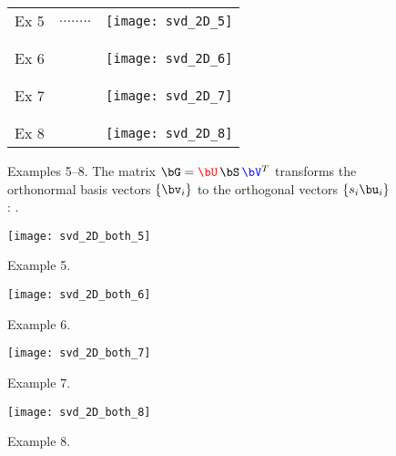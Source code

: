 \documentclass[11pt,titlepage,fleqn]{article}
\begin{document}
\clearpage\pagebreak
\pagestyle{empty}
\begin{figure}
\centering
\begin{tabular}{rcc}
Ex 5 & $........$ & \texttt{[image: svd\_2D\_5]} \\ \\ \\
Ex 6 & &\texttt{[image: svd\_2D\_6]} \\ \\ \\
Ex 7 & &\texttt{[image: svd\_2D\_7]} \\ \\ \\
Ex 8 & &\texttt{[image: svd\_2D\_8]} 
\end{tabular}
\caption[]
{{
Examples 5--8.
The matrix $\bG = \Ucolor\,\bS\,\Vcolor^T$ transforms the orthonormal basis vectors \textcolor{blue}{$\{\bv_i\}$} to the orthogonal vectors \textcolor{red}{$\{s_i\bu_i\}$}: \makebox{$\bG\Vcolor = \Ucolor\,\bS$}.
\label{fig:2D}
}}
\end{figure}

\clearpage\pagebreak
\begin{figure}
\hspace{-1cm}
\texttt{[image: svd\_2D\_both\_5]}
\caption[]
{{
Example 5.
\label{fig:ex5}
}}
\end{figure}

\clearpage\pagebreak
\begin{figure}
\hspace{-1cm}
\texttt{[image: svd\_2D\_both\_6]}
\caption[]
{{
Example 6.
\label{fig:ex6}
}}
\end{figure}

\clearpage\pagebreak
\begin{figure}
\hspace{-1cm}
\texttt{[image: svd\_2D\_both\_7]}
\caption[]
{{
Example 7.
\label{fig:ex7}
}}
\end{figure}

\clearpage\pagebreak
\begin{figure}
\hspace{-1cm}
\texttt{[image: svd\_2D\_both\_8]}
\caption[]
{{
Example 8.
\label{fig:ex8}
}}
\end{figure}

\end{document}
